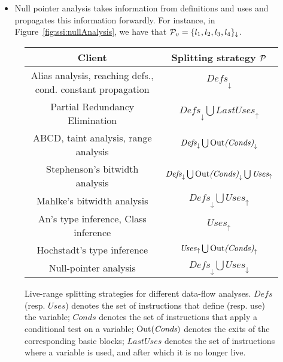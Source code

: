 {\begin{itemize}
\item Null pointer analysis takes information from definitions and uses and propagates this 
  information forwardly.
For instance, in Figure~\ref{fig:ssi:nullAnalysis}, we have that
${\cal P}_{v} = \{l_1, l_2, l_3, l_4\}_\downarrow$.
\end{itemize}

\begin{figure}[t!]
\begin{center}
\begin{small}
\renewcommand\arraystretch{1.4}
\begin{tabular}{ c | c }
{\bf Client} & {\bf Splitting strategy ${\cal P}$} \\  \hline

Alias analysis, reaching defs., cond. constant propagation  
& $\textit{Defs}_\downarrow$ \\

Partial Redundancy Elimination & $\textit{Defs}_\downarrow \bigcup \textit{LastUses}_\uparrow$ \\

ABCD, taint analysis, range analysis & $\textit{Defs}_\downarrow \bigcup 
\textrm{Out}\textit{(Conds)}_\downarrow$ \\

Stephenson's bitwidth analysis & $\textit{Defs}_\downarrow \bigcup 
\textrm{Out}\textit{(Conds)}_\downarrow \bigcup \textit{Uses}_\uparrow$  \\

Mahlke's bitwidth analysis & $\textit{Defs}_\downarrow \bigcup 
\textit{Uses}_\uparrow$  \\

An's type inference, Class inference & $\textit{Uses}_\uparrow$ \\

Hochstadt's type inference & $\textit{Uses}_\uparrow \bigcup 
\textrm{Out}\textit{(Conds)}_\uparrow$ \\

Null-pointer analysis & $\textit{Defs}_\downarrow 
\bigcup\textit{Uses}_\downarrow$ \\

\end{tabular}
\end{small}

\caption{Live-range splitting strategies for different data-flow analyses.
$\textit{Defs}$ (resp. $\textit{Uses}$) denotes the set of instructions that define (resp. use) the variable; $\textit{Conds}$ denotes the set of instructions that apply a conditional test on a variable; $\textrm{Out}(\textit{Conds})$ denotes the exits of the corresponding basic blocks; $\textit{LastUses}$ denotes the set of instructions where a variable is used, and after which it is no longer live.}
\label{fig:splittingSt}
\end{center}
\end{figure}

}

